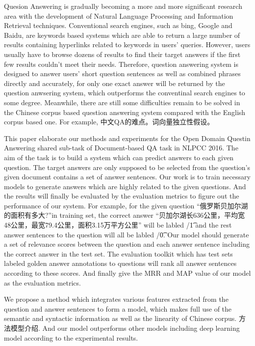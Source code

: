 \documentclass{llncs}
\begin{document}
Quesion Answering is gradually becoming a more and more significant research area with the development of Natural Language Processing and Information Retrieval techniques. Conventional search engines, such as bing, Google and Baidu, are keywords based systems which are able to return a large number of results containing hyperlinks related to keywords in users' queries. However, users usually have to browse dozens of results to find their target answers if the first few results couldn't meet their needs. Therefore, question answering system is designed to answer users' short question sentences as well as combined phrases directly and accurately, for only one exact answer will be returned by the question anwsering system, which outperforms the conventinal search engines to some degree. Meanwhile, there are still some difficulties remain to be solved in the Chinese corpus based question answering system compared with the English corpus based one. For example, 中文QA的难点。词向量独立性假设。

This paper elaborate our methods and experiments for the Open Domain Questin Answering shared sub-task of Document-based QA task in NLPCC 2016. The aim of the task is to build a system which can predict answers to each given question. The target answers are only supposed to be selected from the question's given document contains a set of answer sentences. Our work is to train necessary models to generate answers which are highly related to the given questions. And the results will finally be evaluated by the evaluation metrics to figure out the performance of our system. For example, for the given question “俄罗斯贝加尔湖的面积有多大?”in training set, the correct answer “贝加尔湖长636公里，平均宽48公里，最宽79.4公里，面积3.15万平方公里” will be labled /\t1 and the rest answer sentences to the question will all be labled /\t0. Our model should generate a set of relevance scores between the question and each answer sentence including the correct answer in the test set. The evaluation toolkit which has test sets labeled golden answer annotations to questions will rank all answer sentences according to these scores. And finally give the MRR and MAP value of our model as the evaluation metrics.

We propose a method which integrates various features extracted from the question and answer sentences to form a model, which makes full use of the semantic and syntactic information as well as the linearity of Chinese corpus. 方法模型介绍. And our model outperforms other models including deep learning model according to the  experimental results.
\end{document}
